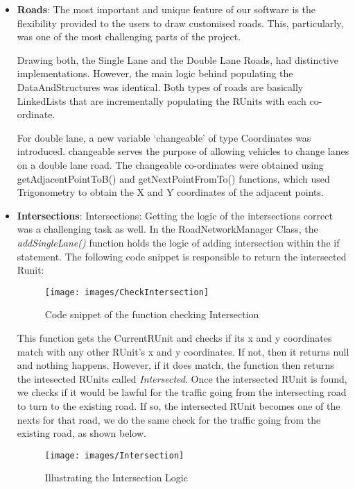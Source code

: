 \documentclass[11pt,a4paper]{article}
\begin{document}
  \begin{itemize}
  	\item \textbf{Roads}: The most important and unique feature of our
  	software is the flexibility provided to the users to draw
  	customised roads. This, particularly, was one of the most
  	challenging parts of the project. 
	
  	Drawing both, the Single Lane and the Double Lane Roads, had
  	distinctive implementations. However, the main logic behind
  	populating the DataAndStructures was identical. Both types of roads
  	are basically LinkedLists that are incrementally populating the
  	RUnits with each co-ordinate. 
  	
  	For double lane, a new variable ‘changeable’ of type Coordinates
  	was introduced. changeable serves the purpose of allowing vehicles
  	to change lanes on a double lane road. The changeable co-ordinates
  	were obtained using
  	getAdjacentPointToB() and getNextPointFromTo() functions, which
  	used Trigonometry to obtain the X and Y coordinates of the adjacent
  	points.

  	\item \textbf{Intersections}: Intersections: Getting the logic of the intersections correct was a challenging task as well. In the RoadNetworkManager Class, the \textit{addSingleLane()} function holds the logic of adding intersection within the if statement. The following code snippet is responsible to return the intersected Runit:  	
  		
  		\begin{figure}[h!]
			\texttt{[image: images/CheckIntersection]}
			\caption{Code snippet of the function checking Intersection}
			\centering
		\end{figure}
  		This function gets the CurrentRUnit and checks if its x and y coordinates match with any other RUnit’s x and y coordinates. If not, then it returns null and nothing happens. However, if it does match, the function then returns the intesected RUnits called \textit{Intersected}. 
  		Once the intersected RUnit is found, we checks if it would be lawful for the traffic going from the intersecting road to turn to the existing road. If so, the intersected RUnit becomes one of the nexts for that road, we do the same check for the traffic going from the existing road, as shown below.  
  		
  		\begin{figure}[h!]
			\texttt{[image: images/Intersection]}
			\caption{Illustrating the Intersection Logic}
			\centering
		\end{figure} 		
  		

\end{itemize}
\end{document}
